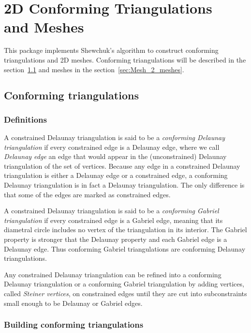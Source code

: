 \chapter{2D Conforming Triangulations\\ and Meshes}
\label{user_chapter_2D_Meshes}

\minitoc

This package implements Shewchuk's algorithm to construct conforming
triangulations and 2D meshes.  Conforming triangulations will be
described in the section~\ref{sec:Mesh_2_conforming_triangulation} and
meshes in the section~\ref{sec:Mesh_2_meshes}.

\section{Conforming triangulations}
\label{sec:Mesh_2_conforming_triangulation}

\subsection{Definitions}
\label{sec:Mesh_2_conforming_definitions}

A constrained Delaunay triangulation is said to be a \emph{conforming
  Delaunay triangulation} if every constrained edge is a Delaunay
edge, where we call {\em Delaunay edge} an edge that would appear in
the (unconstrained) Delaunay triangulation of the set of vertices.
Because any edge in a constrained Delaunay triangulation is either a
Delaunay edge or a constrained edge, a conforming Delaunay
triangulation is in fact a Delaunay triangulation. The only difference
is that some of the edges are marked as constrained edges.

A constrained Delaunay triangulation is said to be a \emph{conforming
  Gabriel triangulation} if every constrained edge is a Gabriel edge,
meaning that its diametral circle includes no vertex of the
triangulation in its interior. The Gabriel property is stronger that
the Delaunay property and each Gabriel edge is a Delaunay edge. Thus
conforming Gabriel triangulations are conforming Delaunay
triangulations.

Any constrained Delaunay triangulation can be refined into a
conforming Delaunay triangulation or a conforming Gabriel
triangulation by adding vertices, called \emph{Steiner vertices}, on
constrained edges until they are cut into subconstraints small enough
to be Delaunay or Gabriel edges.

\subsection{Building conforming triangulations}
\label{sec:Mesh_2_building_conforming}


